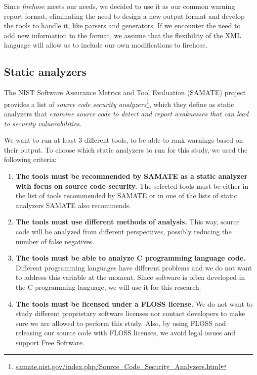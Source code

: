 Since \textit{firehose} meets our needs, we decided to use it as our common
warning report format, eliminating the need
to design a new output format and develop the tools to
handle it, like parsers and generators. If we encounter the need to add new information to the
format, we assume that the flexibility of the XML language will allow us to
include our own modifications to firehose.

\subsection{Static analyzers}

The NIST Software Assurance Metrics and Tool Evaluation (SAMATE) project
provides a list of \textit{source code security
analyzers}\footnote{\url{samate.nist.gov/index.php/Source_Code_Security_Analyzers.html}},
which they define as static analyzers that \textit{examine source code to
detect and report weaknesses that can lead to security vulnerabilities}.

We want to run at least 3 different tools, to be able to rank warnings based on
their output. To choose which static analyzers to run for this study, we used
the following criteria:

\begin{enumerate}
  \item \textbf{The tools must be recommended by SAMATE as a static analyzer with focus on source code security.} The selected tools must be either in the list of tools recommended by SAMATE or in one of the lists of static analyzers SAMATE also recommends.
  \item \textbf{The tools must use different methods of analysis.} This way, source code will be analyzed from different perspectives, possibly reducing the number of false negatives.
  \item \textbf{The tools must be able to analyze C programming language code.} Different programming languages have different problems and we do not want to address this variable at the moment. Since software is often developed in the C programming language, we will use it for this research.
  \item \textbf{The tools must be licensed under a FLOSS license.} We do not want to study different proprietary software licenses nor contact developers to make sure we are allowed to perform this study. Also, by using FLOSS and releasing our source code with FLOSS licenses, we avoid legal issues and support Free Software.
\end{enumerate}

